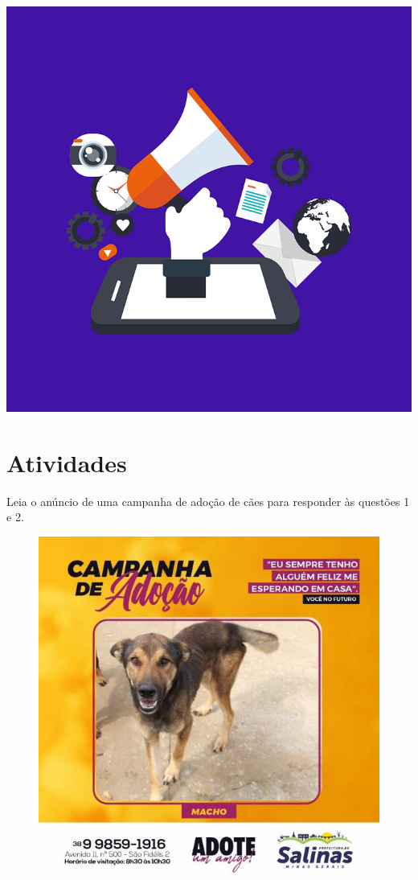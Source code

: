 {%
\includegraphics[width=\textwidth]{./_SAEB_9_POR/media/image18.png}
}

\section{Atividades}

Leia o anúncio de uma campanha de adoção de cães para responder às
questões 1 e 2.\pagebreak


\begin{figure}[htpb!]
\includegraphics[width=\textwidth]{./_SAEB_9_POR/media/image19.jpeg}
\end{figure}

